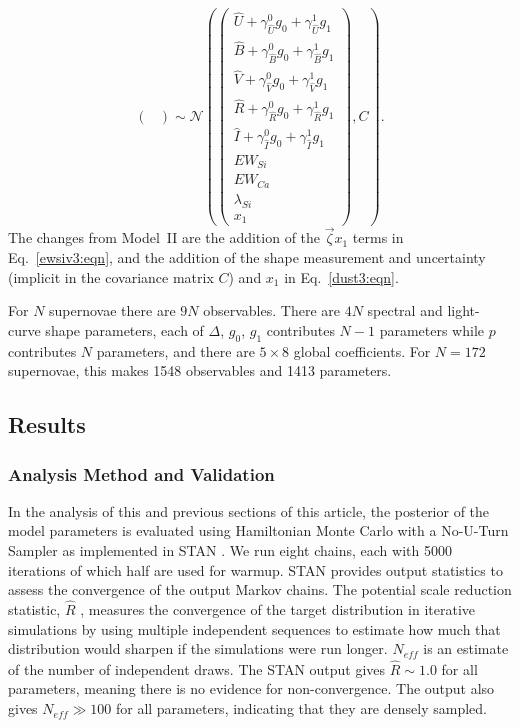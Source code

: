\documentclass[trackchanges]{aastex61}   	%
\begin{document}
{\begin{equation}
\begin{pmatrix}
\end{pmatrix}
\sim \mathcal{N}
\left(
\begin{pmatrix}
{\hat{U}} +\gamma^0_{{\hat{U}}} g_0 +\gamma^1_{{\hat{U}}} g_1 \\{\hat{B}} +\gamma^0_{{\hat{B}}} g_0 +\gamma^1_{{\hat{B}}} g_1 \\
{\hat{V}}+\gamma^0_{{\hat{V}}} g_0+\gamma^1_{{\hat{V}}} g_1\\{\hat{R}}+\gamma^0_{{\hat{R}}} g_0 + \gamma^1_{{\hat{R}}} g_1\\{\hat{I}}+\gamma^0_{{\hat{I}}} g_0+\gamma^1_{{\hat{I}}} g_1\\
EW_{Si}\\ EW_{Ca} \\ \lambda_{Si} \\ x_1
\end{pmatrix}
,C
\right).
\label{dust3:eqn}
\end{equation}
The changes from Model~II are the addition of the $\vec{\zeta} x_1$ terms in Eq.~\ref{ewsiv3:eqn}, and
the addition of the shape measurement and uncertainty (implicit in the covariance matrix $C$) and $x_1$   in Eq.~\ref{dust3:eqn}.

For $N$ supernovae there are $9N$ observables.  There are $4N$ spectral and light-curve shape parameters, each of
$\Delta$, $g_0$, $g_1$ contributes $N-1$ parameters while $p$  contributes $N$ parameters,  and there are $5 \times 8$ global coefficients.
For $N=172$ supernovae, this makes 1548 observables and 1413  parameters.
}

\subsection{Results}
\subsubsection{Analysis Method and Validation}

In the analysis of this and previous sections of this article,
the posterior of the model parameters is evaluated using Hamiltonian Monte Carlo with a No-U-Turn
Sampler as implemented in
STAN \citep{JSSv076i01}.  We run eight chains, each with 5000 iterations of which
half are used for warmup.
STAN provides output statistics to assess
the convergence of the output Markov chains.
The 
potential scale reduction statistic, $\hat{R}$
\citep[][in this paragraph not to be confused with the synthetic $\hat{R}$-band magnitude]{Gelman92}, measures the convergence of the target distribution
in iterative simulations 
by using multiple independent sequences to estimate how much that distribution would sharpen if the simulations were run longer.
$N_{\mathit{eff}}$ is an estimate of the number of independent draws. The STAN output gives $\hat{R} \sim 1.0$ for all parameters, meaning there is no evidence for non-convergence.  The
output also gives  $N_{\mathit{eff}} \gg 100$ for all parameters, indicating that they are densely sampled.
\end{document}
